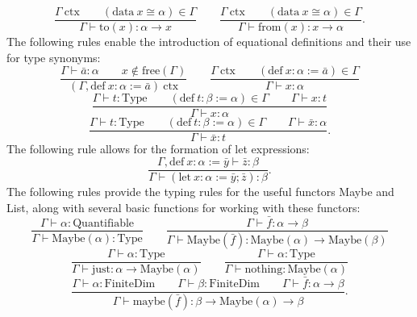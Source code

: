 \documentclass[11pt]{article}
\begin{document}
\begin{equation}
	\frac{\Gamma\ \text{ctx} \qquad
	(\text{data}\ x \cong \alpha) \in \Gamma}
	{\Gamma \vdash \text{to}(x) : \alpha \to x}
	\qquad
	\frac{\Gamma\ \text{ctx} \qquad
	(\text{data}\ x \cong \alpha) \in \Gamma}
	{\Gamma \vdash \text{from}(x) : x \to \alpha}.
\end{equation}
The following rules enable the introduction of equational
definitions and their use for type synonyms:
\begin{equation}
	\frac{\Gamma \vdash \bar{a} : \alpha
	\qquad x \notin \text{free}(\Gamma)}
	{(\Gamma, \text{def}\ x : \alpha := \bar{a})\ \text{ctx}}
	\qquad
	\frac{\Gamma\ \text{ctx}
	\qquad (\text{def}\ x : \alpha := \bar{a}) \in \Gamma}
	{\Gamma \vdash x : \alpha}
\end{equation}
\begin{equation}
	\frac{\Gamma \vdash t : \text{Type}
	\qquad (\text{def}\ t : \beta := \alpha) \in \Gamma
	\qquad \Gamma \vdash x : t}
	{\Gamma \vdash x : \alpha}
\end{equation}
\begin{equation}
	\frac{\Gamma \vdash t : \text{Type}
	\qquad (\text{def}\ t : \beta := \alpha) \in \Gamma
	\qquad \Gamma \vdash \bar{x} : \alpha}
	{\Gamma \vdash \bar{x} : t}.
\end{equation}
The following rule allows for the formation of let expressions:
\begin{equation}
	\frac{\Gamma, \text{def}\ x : \alpha := \bar{y} \vdash \bar{z} : \beta}
	{\Gamma \vdash
	 (\text{let}\ x : \alpha := \bar{y}; \bar{z}) : \beta}.
\end{equation}
The following rules provide the typing rules for the useful
functors Maybe and List, along
with several basic functions for working with these functors:
\begin{equation}
	\frac{\Gamma \vdash \alpha : \text{Quantifiable}}
	{\Gamma \vdash \text{Maybe}(\alpha) : \text{Type}}
	\qquad
	\frac{\Gamma \vdash \bar{f} : \alpha \to \beta}
	{\Gamma \vdash \text{Maybe}(\bar{f}) : \text{Maybe}(\alpha) \to \text{Maybe}(\beta)}
\end{equation}
\begin{equation}
	\frac{\Gamma \vdash \alpha : \text{Type}}
	{\Gamma \vdash \text{just} : \alpha \to \text{Maybe}(\alpha)}
	\qquad
	\frac{\Gamma \vdash \alpha : \text{Type}}
	{\Gamma \vdash \text{nothing} : \text{Maybe}(\alpha)}
\end{equation}
\begin{equation}
	\frac{\Gamma \vdash \alpha : \text{FiniteDim}
	\qquad \Gamma \vdash \beta : \text{FiniteDim}
	\qquad \Gamma \vdash \bar{f} : \alpha \to \beta}
	{\Gamma \vdash \text{maybe}(\bar{f}) : \beta \to \text{Maybe}(\alpha) \to \beta}.
\end{equation}
\end{document}

